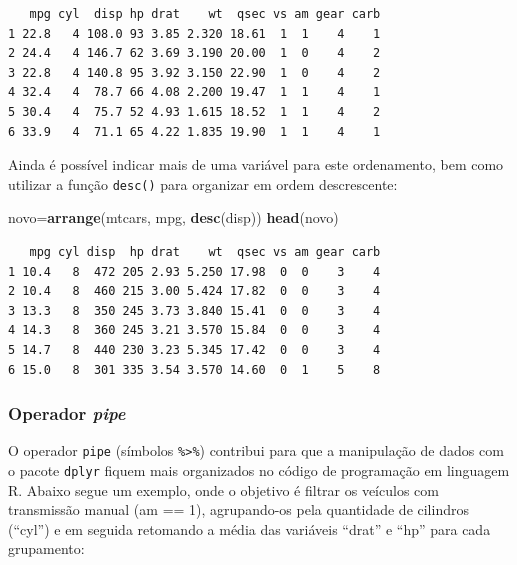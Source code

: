 \documentclass[12pt,brazil,oneside]{book}
\newenvironment{Shaded}{\begin{snugshade}}{\end{snugshade}}
\newcommand{\DataTypeTok}[1]{\textcolor[rgb]{0.13,0.29,0.53}{#1}}
\newcommand{\DecValTok}[1]{\textcolor[rgb]{0.00,0.00,0.81}{#1}}
\newcommand{\KeywordTok}[1]{\textcolor[rgb]{0.13,0.29,0.53}{\textbf{#1}}}
\newcommand{\NormalTok}[1]{#1}
\newcommand{\OperatorTok}[1]{\textcolor[rgb]{0.81,0.36,0.00}{\textbf{#1}}}
\newcommand{\StringTok}[1]{\textcolor[rgb]{0.31,0.60,0.02}{#1}}
\begin{document}
\begin{verbatim}
   mpg cyl  disp hp drat    wt  qsec vs am gear carb
1 22.8   4 108.0 93 3.85 2.320 18.61  1  1    4    1
2 24.4   4 146.7 62 3.69 3.190 20.00  1  0    4    2
3 22.8   4 140.8 95 3.92 3.150 22.90  1  0    4    2
4 32.4   4  78.7 66 4.08 2.200 19.47  1  1    4    1
5 30.4   4  75.7 52 4.93 1.615 18.52  1  1    4    2
6 33.9   4  71.1 65 4.22 1.835 19.90  1  1    4    1
\end{verbatim}

Ainda é possível indicar mais de uma variável para este ordenamento, bem como utilizar a função \texttt{desc()} para organizar em ordem descrescente:

\begin{Shaded}
\begin{Highlighting}[]
\NormalTok{novo=}\KeywordTok{arrange}\NormalTok{(mtcars, mpg, }\KeywordTok{desc}\NormalTok{(disp))}
\KeywordTok{head}\NormalTok{(novo)}
\end{Highlighting}
\end{Shaded}

\begin{verbatim}
   mpg cyl disp  hp drat    wt  qsec vs am gear carb
1 10.4   8  472 205 2.93 5.250 17.98  0  0    3    4
2 10.4   8  460 215 3.00 5.424 17.82  0  0    3    4
3 13.3   8  350 245 3.73 3.840 15.41  0  0    3    4
4 14.3   8  360 245 3.21 3.570 15.84  0  0    3    4
5 14.7   8  440 230 3.23 5.345 17.42  0  0    3    4
6 15.0   8  301 335 3.54 3.570 14.60  0  1    5    8
\end{verbatim}

\hypertarget{operador-pipe}{%
\subsubsection{\texorpdfstring{Operador \emph{pipe}}{Operador pipe}}\label{operador-pipe}}

O operador \texttt{pipe} (símbolos \texttt{\%\textgreater{}\%}) contribui para que a manipulação de dados com o pacote \texttt{dplyr} fiquem mais organizados no código de programação em linguagem R. Abaixo segue um exemplo, onde o objetivo é filtrar os veículos com transmissão manual (am == 1), agrupando-os pela quantidade de cilindros (``cyl'') e em seguida retomando a média das variáveis ``drat'' e ``hp'' para cada grupamento:

\begin{Shaded}
\end{Shaded}
\end{document}

